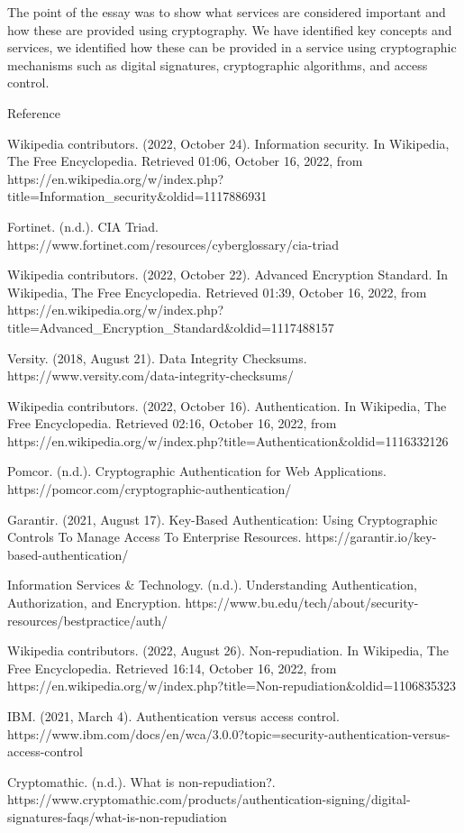 \documentclass[11pt]{article}
\begin{document}
The point of the essay was to show what services are considered
important and how these are provided using cryptography. We have
identified key concepts and services, we identified how these can be
provided in a service using cryptographic mechanisms such as digital
signatures, cryptographic algorithms, and access control.

Reference 

Wikipedia contributors. (2022, October 24). Information security. In
Wikipedia, The Free Encyclopedia. Retrieved 01:06, October 16, 2022,
from
https://en.wikipedia.org/w/index.php?title=Information\_security\&oldid=1117886931

Fortinet. (n.d.). CIA Triad.
https://www.fortinet.com/resources/cyberglossary/cia-triad

Wikipedia contributors. (2022, October 22). Advanced Encryption
Standard. In Wikipedia, The Free Encyclopedia. Retrieved 01:39, October
16, 2022, from
https://en.wikipedia.org/w/index.php?title=Advanced\_Encryption\_Standard\&oldid=1117488157

Versity. (2018, August 21). Data Integrity Checksums.
https://www.versity.com/data-integrity-checksums/

Wikipedia contributors. (2022, October 16). Authentication. In
Wikipedia, The Free Encyclopedia. Retrieved 02:16, October 16, 2022,
from
https://en.wikipedia.org/w/index.php?title=Authentication\&oldid=1116332126

Pomcor. (n.d.). Cryptographic Authentication for Web Applications.
https://pomcor.com/cryptographic-authentication/

Garantir. (2021, August 17). Key-Based Authentication: Using
Cryptographic Controls To Manage Access To Enterprise Resources.
https://garantir.io/key-based-authentication/

Information Services \& Technology. (n.d.). Understanding
Authentication, Authorization, and Encryption.
https://www.bu.edu/tech/about/security-resources/bestpractice/auth/

Wikipedia contributors. (2022, August 26). Non-repudiation. In
Wikipedia, The Free Encyclopedia. Retrieved 16:14, October 16, 2022,
from
https://en.wikipedia.org/w/index.php?title=Non-repudiation\&oldid=1106835323

IBM. (2021, March 4). Authentication versus access control.
https://www.ibm.com/docs/en/wca/3.0.0?topic=security-authentication-versus-access-control

Cryptomathic. (n.d.). What is non-repudiation?.
https://www.cryptomathic.com/products/authentication-signing/digital-signatures-faqs/what-is-non-repudiation
\end{document}
